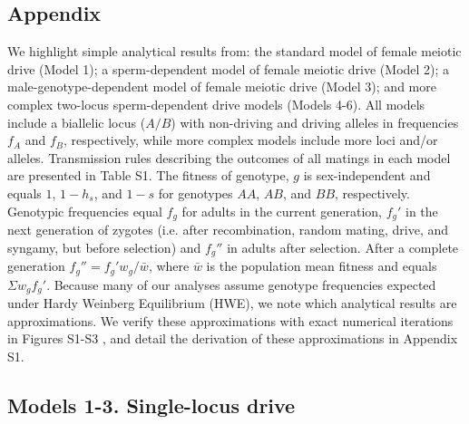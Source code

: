 \documentclass{pnastwo}
\begin{document}
\begin{article}
\section{Appendix}
We highlight simple analytical results from: 
	the standard model of female meiotic drive (Model 1); a sperm-dependent 
	model of female meiotic drive (Model 2); a male-genotype-dependent model of
	female meiotic drive (Model 3); and more complex two-locus sperm-dependent drive models (Models 4-6). 
All models include a biallelic locus ($A/B$) with non-driving and driving alleles in frequencies $f_A$ and $f_B$, 
	respectively, while more complex models include more loci and/or alleles.  
Transmission rules describing the outcomes of all matings in each
	model are presented in Table S1. 
The fitness of genotype, $g$ is sex-independent and equals $1$, $1-h_s$, and $1-s$ for genotypes $AA$, $AB$, and $BB$, respectively. 
Genotypic frequencies  equal  $f_g$ for adults in the current generation, 
	$f_g'$ in the next generation of zygotes (i.e. after recombination, random mating, drive, and syngamy, but before selection)
	and $f_g''$ in adults after selection. 
After a complete generation $f_g'' = f_g' w_g/\bar{w}$, where $\bar{w}$ is the population mean fitness and equals $\Sigma w_g f_g'$. 
Because many of our analyses assume genotype frequencies expected under Hardy Weinberg Equilibrium (HWE), we note which analytical results are approximations. 
We verify these approximations with exact numerical iterations in Figures S1-S3 , and detail the derivation of these approximations in Appendix S1.  



\subsection{Models 1-3. Single-locus drive}

\end{article}
\end{document}
